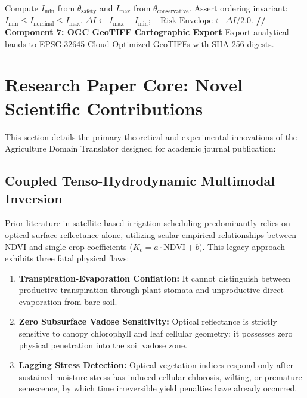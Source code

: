 \documentclass[11pt,a4paper]{article}
\theoremstyle{definition}
\theoremstyle{remark}
\begin{document}
\begin{algorithm}[H]
\begin{algorithmic}[1]
\State Compute $I_{\min}$ from $\theta_{\text{safety}}$ and $I_{\max}$ from $\theta_{\text{conservative}}$.
\State Assert ordering invariant: $I_{\min} \le I_{\text{nominal}} \le I_{\max}$.
\State $\Delta I \leftarrow I_{\max} - I_{\min}; \quad \text{Risk Envelope} \leftarrow \Delta I / 2.0$.
\State \textbf{// Component 7: OGC GeoTIFF Cartographic Export}
\State Export analytical bands to EPSG:32645 Cloud-Optimized GeoTIFFs with SHA-256 digests.
\end{algorithmic}
\end{algorithm}


\section{Research Paper Core: Novel Scientific Contributions}

This section details the primary theoretical and experimental innovations of the Agriculture Domain Translator designed for academic journal publication:

\subsection{Coupled Tenso-Hydrodynamic Multimodal Inversion}
Prior literature in satellite-based irrigation scheduling predominantly relies on optical surface reflectance alone, utilizing scalar empirical relationships between NDVI and single crop coefficients ($K_c = a \cdot \text{NDVI} + b$). This legacy approach exhibits three fatal physical flaws:
\begin{enumerate}
    \item \textbf{Transpiration-Evaporation Conflation:} It cannot distinguish between productive transpiration through plant stomata and unproductive direct evaporation from bare soil.
    \item \textbf{Zero Subsurface Vadose Sensitivity:} Optical reflectance is strictly sensitive to canopy chlorophyll and leaf cellular geometry; it possesses zero physical penetration into the soil vadose zone.
    \item \textbf{Lagging Stress Detection:} Optical vegetation indices respond only after sustained moisture stress has induced cellular chlorosis, wilting, or premature senescence, by which time irreversible yield penalties have already occurred.
\end{enumerate}
\end{document}
